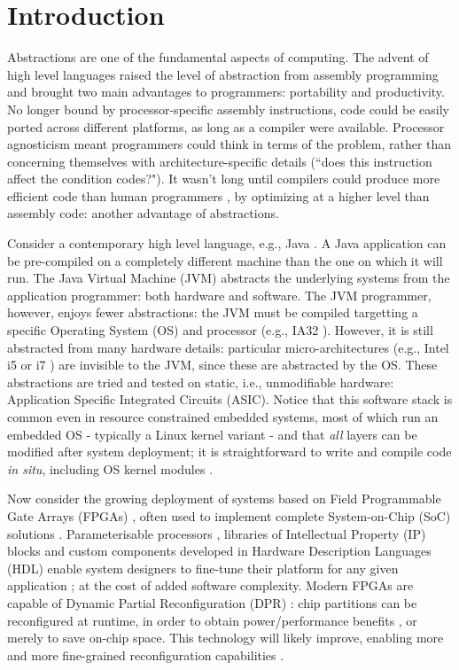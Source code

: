 




\section{Introduction}

Abstractions are one of the fundamental aspects of computing. The advent of high level languages \cite{} raised the level of abstraction from assembly programming and brought two main advantages to programmers: portability and productivity. No longer bound by processor-specific assembly instructions, code could be easily ported across different platforms, as long as a compiler were available. Processor agnosticism meant programmers could think in terms of the problem, rather than concerning themselves with architecture-specific details (``does this instruction affect the condition codes?"). It wasn't long until compilers could produce more efficient code than human programmers \cite{}, by optimizing at a higher level than assembly code: another advantage of abstractions.
\par Consider a contemporary high level language, e.g., Java \cite{}. A Java application can be pre-compiled on a completely different machine than the one on which it will run. The Java Virtual Machine (JVM) abstracts the underlying systems from the application programmer: both hardware and software. The JVM programmer, however, enjoys fewer abstractions: the JVM must be compiled targetting a specific Operating System (OS) and processor (e.g., IA32 \cite{}). However, it is still abstracted from many hardware details: particular micro-architectures (e.g., Intel i5 or i7 \cite{}) are invisible to the JVM, since these are abstracted by the OS. These abstractions are tried and tested on static, i.e., unmodifiable hardware: Application Specific Integrated Circuits (ASIC). Notice that this software stack is common even in resource constrained embedded systems, most of which run an embedded OS - typically a Linux kernel variant \cite{} - and that \textit{all} layers can be modified after system deployment; it is straightforward to write and compile code \textit{in situ}, including OS kernel modules \cite{}.
\par Now consider the growing deployment of systems based on Field Programmable Gate Arrays (FPGAs) \cite{}, often used to implement complete System-on-Chip (SoC) solutions \cite{}. Parameterisable processors \cite{}, libraries of Intellectual Property (IP) blocks \cite{} and custom components developed in Hardware Description Languages (HDL) \cite{} enable system designers to fine-tune their platform for any given application \cite{}; at the cost of added software complexity. Modern FPGAs are capable of Dynamic Partial Reconfiguration (DPR) \cite{}: chip partitions can be reconfigured at runtime, in order to obtain power/performance benefits \cite{}, or merely to save on-chip space. This technology will likely improve, enabling more and more fine-grained reconfiguration capabilities \cite{}.

